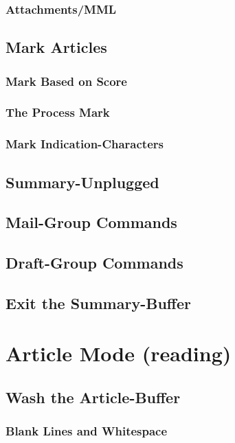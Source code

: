 \documentclass{article}
\begin{document}
        \subsubsection*{Attachments/MML}
        \MsgCompositionMML
    \subsection*{Mark Articles}
    \MarkArticlesGeneral
        \subsubsection*{Mark Based on Score}
        \MarkByScore
        \subsubsection*{The Process Mark}
        \ProcessMark
        \subsubsection*{Mark Indication-Characters}
        \MarkCharacters
%
    \subsection*{Summary-Unplugged}
    \SummaryUnplugged
\pagebreak    
    \subsection*{Mail-Group Commands}
    \MailGroups
    \subsection*{Draft-Group Commands}
    \DraftGroup
    \subsection*{Exit the Summary-Buffer}
    \ExitSummary
%
%
\section*{Article Mode (reading)}
\ArticleModeGeneral
    \subsection*{Wash the Article-Buffer}
    \WashArticle
    \subsubsection*{Blank Lines and Whitespace}
    \BlankAndWhitespace
\end{document}
